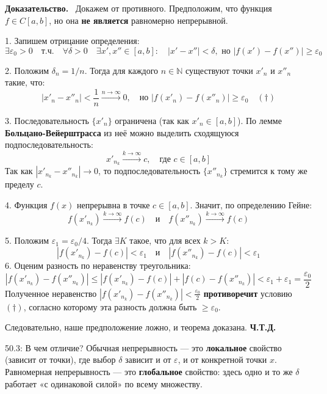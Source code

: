 \documentclass[a4paper,12pt]{article}
\newcommand{\myproof}{\textbf{Доказательство.}\ }
\begin{document}
	\vspace{0.5cm}
	\myproof
	Докажем от противного. Предположим, что функция $f \in C[a, b]$, но она \textbf{не является} равномерно непрерывной.
	
	1. Запишем отрицание определения:
	$$ \exists \varepsilon_0 > 0 \quad \text{т.ч.} \quad \forall \delta > 0 \quad \exists x', x'' \in [a, b]: \quad |x' - x''| < \delta, \text{ но } |f(x') - f(x'')| \geq \varepsilon_0 $$
	
	2. Положим $\delta_n = 1/n$. Тогда для каждого $n \in \mathbb{N}$ существуют точки $x'_n$ и $x''_n$ такие, что:
	$$ |x'_n - x''_n| < \frac{1}{n} \xrightarrow{n \to \infty} 0, \quad \text{но } |f(x'_n) - f(x''_n)| \geq \varepsilon_0 \quad (\dagger) $$
	
	3. Последовательность $\{x'_n\}$ ограничена (так как $x'_n \in [a, b]$). По лемме \textbf{Больцано-Вейерштрасса} из неё можно выделить сходящуюся подпоследовательность:
	$$ x'_{n_k} \xrightarrow{k \to \infty} c, \quad \text{где } c \in [a, b] $$
	Так как $|x'_{n_k} - x''_{n_k}| \to 0$, то подпоследовательность $\{x''_{n_k}\}$ стремится к тому же пределу $c$.
	
	4. Функция $f(x)$ непрерывна в точке $c \in [a, b]$. Значит, по определению Гейне:
	$$ f(x'_{n_k}) \xrightarrow{k \to \infty} f(c) \quad \text{и} \quad f(x''_{n_k}) \xrightarrow{k \to \infty} f(c) $$
	
	5. Положим $\varepsilon_1 = \varepsilon_0/4$. Тогда $\exists K$ такое, что для всех $k > K$:
	$$ |f(x'_{n_k}) - f(c)| < \varepsilon_1 \quad \text{и} \quad |f(x''_{n_k}) - f(c)| < \varepsilon_1 $$
	6. Оценим разность по неравенству треугольника:
	$$ |f(x'_{n_k}) - f(x''_{n_k})| \leq |f(x'_{n_k}) - f(c)| + |f(c) - f(x''_{n_k})| < \varepsilon_1 + \varepsilon_1 = \frac{\varepsilon_0}{2} $$
	Полученное неравенство $|f(x'_{n_k}) - f(x''_{n_k})| < \frac{\varepsilon_0}{2}$ \textbf{противоречит} условию $(\dagger)$, согласно которому эта разность должна быть $\geq \varepsilon_0$.
	
	Следовательно, наше предположение ложно, и теорема доказана. \textbf{Ч.Т.Д.}
	
	
	\begin{notebook}{50.3: В чем отличие?}
		Обычная непрерывность — это \textbf{локальное} свойство (зависит от точки), где выбор $\delta$ зависит и от $\varepsilon$, и от конкретной точки $x$. Равномерная непрерывность — это \textbf{глобальное} свойство: здесь одно и то же $\delta$ работает «с одинаковой силой» по всему множеству.
	\end{notebook}
	
\end{document}
